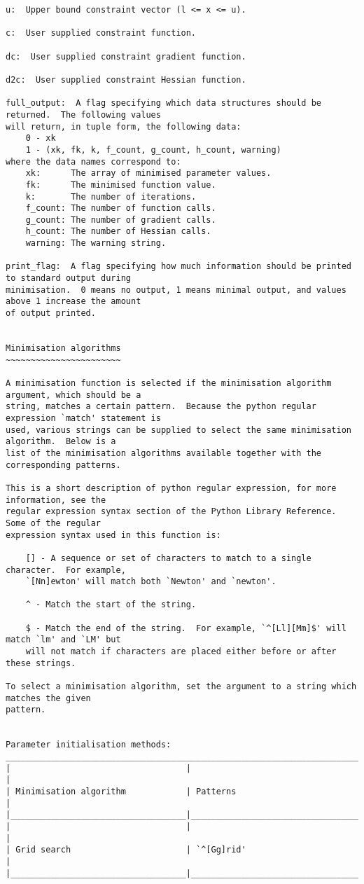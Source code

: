 {\begin{verbatim}
u:  Upper bound constraint vector (l <= x <= u).

c:  User supplied constraint function.

dc:  User supplied constraint gradient function.

d2c:  User supplied constraint Hessian function.

full_output:  A flag specifying which data structures should be returned.  The following values
will return, in tuple form, the following data:
    0 - xk
    1 - (xk, fk, k, f_count, g_count, h_count, warning)
where the data names correspond to:
    xk:      The array of minimised parameter values.
    fk:      The minimised function value.
    k:       The number of iterations.
    f_count: The number of function calls.
    g_count: The number of gradient calls.
    h_count: The number of Hessian calls.
    warning: The warning string.

print_flag:  A flag specifying how much information should be printed to standard output during
minimisation.  0 means no output, 1 means minimal output, and values above 1 increase the amount
of output printed.


Minimisation algorithms
~~~~~~~~~~~~~~~~~~~~~~~

A minimisation function is selected if the minimisation algorithm argument, which should be a
string, matches a certain pattern.  Because the python regular expression `match' statement is
used, various strings can be supplied to select the same minimisation algorithm.  Below is a
list of the minimisation algorithms available together with the corresponding patterns.

This is a short description of python regular expression, for more information, see the
regular expression syntax section of the Python Library Reference.  Some of the regular
expression syntax used in this function is:

    [] - A sequence or set of characters to match to a single character.  For example,
    `[Nn]ewton' will match both `Newton' and `newton'.

    ^ - Match the start of the string.

    $ - Match the end of the string.  For example, `^[Ll][Mm]$' will match `lm' and `LM' but
    will not match if characters are placed either before or after these strings.

To select a minimisation algorithm, set the argument to a string which matches the given
pattern.


Parameter initialisation methods:
___________________________________________________________________________________________
|                                   |                                                     |
| Minimisation algorithm            | Patterns                                            |
|___________________________________|_____________________________________________________|
|                                   |                                                     |
| Grid search                       | `^[Gg]rid'                                          |
|___________________________________|_____________________________________________________|



\end{verbatim}}
